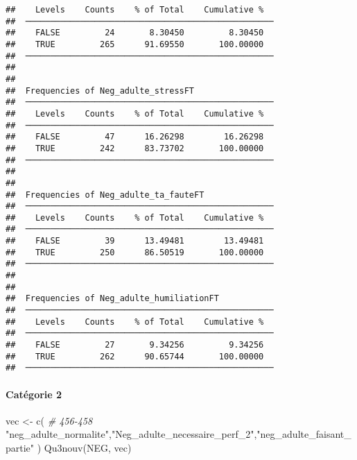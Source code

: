 \documentclass[
]{article}
\newenvironment{Shaded}{\begin{snugshade}}{\end{snugshade}}
\newcommand{\CommentTok}[1]{\textcolor[rgb]{0.56,0.35,0.01}{\textit{#1}}}
\newcommand{\FunctionTok}[1]{\textcolor[rgb]{0.00,0.00,0.00}{#1}}
\newcommand{\NormalTok}[1]{#1}
\newcommand{\OtherTok}[1]{\textcolor[rgb]{0.56,0.35,0.01}{#1}}
\newcommand{\StringTok}[1]{\textcolor[rgb]{0.31,0.60,0.02}{#1}}
\begin{document}
\begin{verbatim}
##    Levels    Counts    % of Total    Cumulative %   
##  ────────────────────────────────────────────────── 
##    FALSE         24       8.30450         8.30450   
##    TRUE         265      91.69550       100.00000   
##  ────────────────────────────────────────────────── 
## 
## 
##  Frequencies of Neg_adulte_stressFT                 
##  ────────────────────────────────────────────────── 
##    Levels    Counts    % of Total    Cumulative %   
##  ────────────────────────────────────────────────── 
##    FALSE         47      16.26298        16.26298   
##    TRUE         242      83.73702       100.00000   
##  ────────────────────────────────────────────────── 
## 
## 
##  Frequencies of Neg_adulte_ta_fauteFT               
##  ────────────────────────────────────────────────── 
##    Levels    Counts    % of Total    Cumulative %   
##  ────────────────────────────────────────────────── 
##    FALSE         39      13.49481        13.49481   
##    TRUE         250      86.50519       100.00000   
##  ────────────────────────────────────────────────── 
## 
## 
##  Frequencies of Neg_adulte_humiliationFT            
##  ────────────────────────────────────────────────── 
##    Levels    Counts    % of Total    Cumulative %   
##  ────────────────────────────────────────────────── 
##    FALSE         27       9.34256         9.34256   
##    TRUE         262      90.65744       100.00000   
##  ──────────────────────────────────────────────────
\end{verbatim}

\hypertarget{catuxe9gorie-2-5}{%
\paragraph{Catégorie 2}\label{catuxe9gorie-2-5}}

\begin{Shaded}
\begin{Highlighting}[]
\NormalTok{vec }\OtherTok{\textless{}{-}} \FunctionTok{c}\NormalTok{(  }\CommentTok{\# 456{-}458}
  \StringTok{"neg\_adulte\_normalite"}\NormalTok{,}\StringTok{"Neg\_adulte\_necessaire\_perf\_2"}\NormalTok{,}\StringTok{"neg\_adulte\_faisant\_partie"}
\NormalTok{)}
\FunctionTok{Qu3nouv}\NormalTok{(NEG, vec)}
\end{Highlighting}
\end{Shaded}
\end{document}
